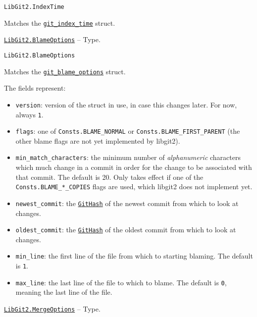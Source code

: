 \begin{adjustwidth}{2em}{0pt}


\begin{verbatim}
LibGit2.IndexTime
\end{verbatim}

Matches the \href{https://libgit2.org/libgit2/\#HEAD/type/git\_index\_time}{\texttt{git\_index\_time}} struct.



\end{adjustwidth}
\hypertarget{13109557230915215869}{}
\hyperlink{13109557230915215869}{\texttt{LibGit2.BlameOptions}}  -- {Type.}

\begin{adjustwidth}{2em}{0pt}


\begin{verbatim}
LibGit2.BlameOptions
\end{verbatim}

Matches the \href{https://libgit2.org/libgit2/\#HEAD/type/git\_blame\_options}{\texttt{git\_blame\_options}} struct.

The fields represent:

\begin{itemize}
\item \texttt{version}: version of the struct in use, in case this changes later. For now, always \texttt{1}.


\item \texttt{flags}: one of \texttt{Consts.BLAME\_NORMAL} or \texttt{Consts.BLAME\_FIRST\_PARENT} (the other blame flags  are not yet implemented by libgit2).


\item \texttt{min\_match\_characters}: the minimum number of \emph{alphanumeric} characters which much change in a commit in order for the change to be associated with that commit. The default is 20. Only takes effect if one of the \texttt{Consts.BLAME\_*\_COPIES} flags are used, which libgit2 does not implement yet.


\item \texttt{newest\_commit}: the \hyperlink{202290709580230708}{\texttt{GitHash}} of the newest commit from which to look at changes.


\item \texttt{oldest\_commit}: the \hyperlink{202290709580230708}{\texttt{GitHash}} of the oldest commit from which to look at changes.


\item \texttt{min\_line}: the first line of the file from which to starting blaming. The default is \texttt{1}.


\item \texttt{max\_line}: the last line of the file to which to blame. The default is \texttt{0}, meaning the last line of the file.

\end{itemize}


\end{adjustwidth}
\hypertarget{7663922722360889557}{}
\hyperlink{7663922722360889557}{\texttt{LibGit2.MergeOptions}}  -- {Type.}

